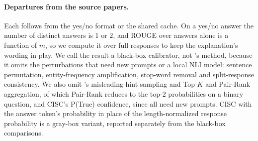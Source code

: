 \paragraph{Departures from the source papers.}
Each follows from the yes/no format or the shared cache. On a yes/no answer
the number of distinct answers is $1$ or $2$, and ROUGE over answers alone is
a function of $m$, so we compute it over full responses to keep the
explanation's wording in play. We call the result a black-box calibrator,
not \citeauthor{pedapati2024}'s method, because it omits the perturbations
that need new prompts or a local NLI model: sentence permutation,
entity-frequency amplification, stop-word removal and split-response
consistency. We also omit \citeauthor{xiong2023}'s misleading-hint sampling
and Top-$K$ and Pair-Rank aggregation, of which Pair-Rank reduces to the
top-$2$ probabilities on a binary question, and CISC's P(True) confidence,
since all need new prompts. CISC with the answer token's probability in
place of the length-normalized response probability is a gray-box variant,
reported separately from the black-box comparisons.
